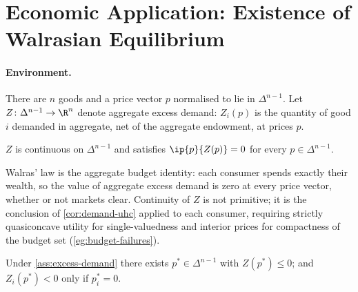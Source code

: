 \section{Economic Application: Existence of Walrasian Equilibrium}
\label{sec:corr-walras}

\paragraph{Environment.} There are $n$ goods and a price vector $p$ normalised to
lie in $\Delta^{n-1}$. Let $Z\colon\Delta^{n-1}\to\R^{n}$ denote aggregate excess
demand: $Z_i(p)$ is the quantity of good $i$ demanded in aggregate, net of the
aggregate endowment, at prices $p$.

\begin{assumption}\label{ass:excess-demand}
	$Z$ is continuous on $\Delta^{n-1}$ and satisfies  $\ip{p}{Z(p)}=0$ for every $p\in\Delta^{n-1}$.
\end{assumption}

Walras' law is the aggregate budget identity: each consumer spends exactly their
wealth, so the value of aggregate excess demand is zero at every price vector,
whether or not markets clear. Continuity of $Z$ is not primitive; it is the
conclusion of \autoref{cor:demand-uhc} applied to each consumer, requiring
strictly quasiconcave utility for single-valuedness and interior prices for
compactness of the budget set (\autoref{eg:budget-failures}).

\begin{theorem}\label{thm:walras-existence}
	Under \autoref{ass:excess-demand} there exists $p^{\ast}\in\Delta^{n-1}$ with
	$Z(p^{\ast})\leq0$; and $Z_i(p^{\ast})<0$ only if $p^{\ast}_i=0$.
\end{theorem}

